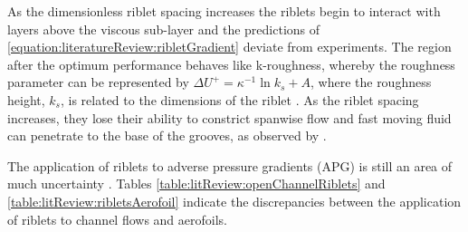 \documentclass[12pt,oneside,a4paper]{article}
\begin{document}
As the dimensionless riblet spacing increases the riblets begin to interact with layers above the viscous sub-layer and the predictions of \eqref{equation:literatureReview:ribletGradient} deviate from experiments. The region after the optimum performance behaves like k-roughness, whereby the roughness parameter can be represented by $\Delta U^+ = \kappa^{-1} \ln k_s + A$, where the roughness height, $k_s$, is related to the dimensions of the riblet \citep{jimenez2004}. As the riblet spacing increases, they lose their ability to constrict spanwise flow and fast moving fluid can penetrate to the base of the grooves, as observed by \cite{lee2001}. 

The application of riblets to adverse pressure gradients (APG) is still an area of much uncertainty \citep{boomsma2015}. Tables \ref{table:litReview:openChannelRiblets} and \ref{table:litReview:ribletsAerofoil} indicate the discrepancies between the application of riblets to channel flows and aerofoils.
%
\end{document}
